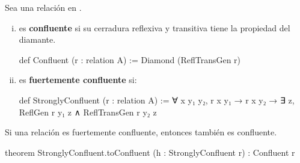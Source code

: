 \begin{defn} Sea  una relación en .
\begin{enumerate}[(i)]

\item {} es \textbf{confluente} si su cerradura 
reflexiva y transitiva tiene la propiedad del diamante.

 \begin{center}
\end{center}

\begin{leancode}
def Confluent (r : relation A) := Diamond (ReflTransGen r)
\end{leancode}

\item {} es \textbf{fuertemente confluente} si:
 \begin{center}
\end{center}

\begin{leancode}
def StronglyConfluent (r : relation A) :=
  ∀ {x y₁ y₂}, r x y₁ → r x y₂ → ∃ z, ReflGen r y₁ z ∧ ReflTransGen r y₂ z
\end{leancode}

\end{enumerate}

\end{defn}

\begin{thm}
Si una relación es fuertemente confluente, entonces también es confluente.
\begin{leancode}
theorem StronglyConfluent.toConfluent (h : StronglyConfluent r) : Confluent r 
\end{leancode}
\end{thm}

